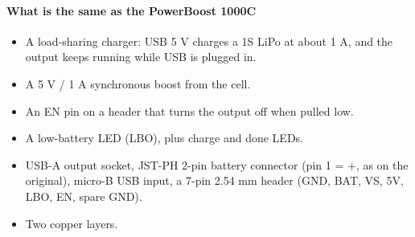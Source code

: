\documentclass[11pt]{article}
\begin{document}
\paragraph*{What is the same as the PowerBoost 1000C}
\begin{itemize}
\item A load-sharing charger: USB 5 V charges a 1S LiPo at about 1 A, and the output keeps running while USB is plugged in.
\item A 5 V / 1 A synchronous boost from the cell.
\item An EN pin on a header that turns the output off when pulled low.
\item A low-battery LED (LBO), plus charge and done LEDs.
\item USB-A output socket, JST-PH 2-pin battery connector (pin 1 = +, as on the original), micro-B USB input, a 7-pin 2.54 mm header (GND, BAT, VS, 5V, LBO, EN, spare GND).
\item Two copper layers.
\end{itemize}
\end{document}
